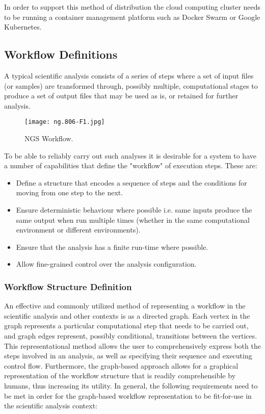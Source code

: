 In order to support this method of distribution the cloud computing cluster needs to be running a container management platform such as Docker Swarm or Google Kubernetes.

\subsection {Workflow Definitions} \label{sec:workflow_definitions}
A typical scientific analysis consists of a series of steps where a set of input files (or samples) are transformed through, possibly multiple, computational stages to produce a set of output files that may be used as is, or retained for further analysis. 

\begin{figure}[h]
\texttt{[image: ng.806-F1.jpg]}
\centering
\caption {NGS Workflow\autocite{depristo2011framework}.}
\label{fig:ng.806-F1.jpg}
\end{figure}


To be able to reliably carry out such analyses it is desirable for a system to have a number of capabilities that define the "workflow" of execution steps. These are:

\begin{itemize}
\item Define a structure that encodes a sequence of steps and the conditions for moving from one step to the next.
\item Ensure deterministic behaviour where possible i.e. same inputs produce the same output when run multiple times (whether in the same computational environment or different environments).
\item Ensure that the analysis has a finite run-time where possible.
\item Allow fine-grained control over the analysis configuration. 
\end{itemize}

\subsubsection{Workflow Structure Definition}
An effective and commonly utilized method of representing a workflow in the scientific analysis and other contexts is as a directed graph. Each vertex in the graph represents a particular computational step that needs to be carried out, and graph edges represent, possibly conditional, transitions between the vertices. This representational method allows the user to comprehensively express both the steps involved in an analysis, as well as specifying their sequence and executing control flow. Furthermore, the graph-based approach allows for a graphical representation of the workflow structure that is readily comprehensible by humans, thus increasing its utility. In general, the following requirements need to be met in order for the graph-based workflow representation to be fit-for-use in the scientific analysis context:

